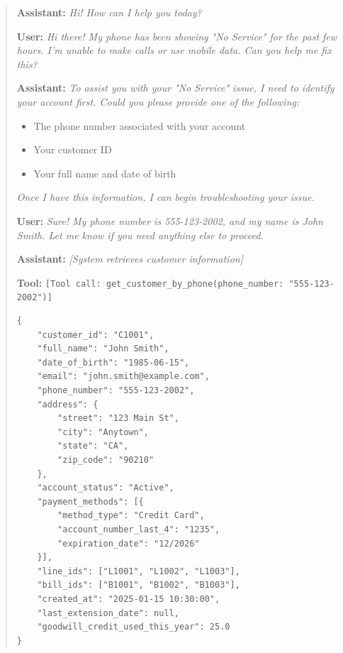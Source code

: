 \begin{quote}
\noindent\textbf{Assistant:} \textit{Hi! How can I help you today?}

\vspace{0.5em}
\noindent\textbf{User:} \textit{Hi there! My phone has been showing "No Service" for the past few hours. I'm unable to make calls or use mobile data. Can you help me fix this?}

\vspace{0.5em}
\noindent\textbf{Assistant:} \textit{To assist you with your "No Service" issue, I need to identify your account first. Could you please provide one of the following:}
\begin{itemize}[leftmargin=*]
\item The phone number associated with your account
\item Your customer ID
\item Your full name and date of birth
\end{itemize}
\textit{Once I have this information, I can begin troubleshooting your issue.}

\vspace{0.5em}
\noindent\textbf{User:} \textit{Sure! My phone number is 555-123-2002, and my name is John Smith. Let me know if you need anything else to proceed.}

\vspace{0.5em}
\noindent\textbf{Assistant:} \textit{[System retrieves customer information]}

\vspace{0.5em}
\noindent\textbf{Tool:} \texttt{[Tool call: get\_customer\_by\_phone(phone\_number: "555-123-2002")]}

\begin{verbatim}
{
    "customer_id": "C1001",
    "full_name": "John Smith",
    "date_of_birth": "1985-06-15",
    "email": "john.smith@example.com",
    "phone_number": "555-123-2002",
    "address": {
        "street": "123 Main St",
        "city": "Anytown",
        "state": "CA",
        "zip_code": "90210"
    },
    "account_status": "Active",
    "payment_methods": [{
        "method_type": "Credit Card",
        "account_number_last_4": "1235",
        "expiration_date": "12/2026"
    }],
    "line_ids": ["L1001", "L1002", "L1003"],
    "bill_ids": ["B1001", "B1002", "B1003"],
    "created_at": "2025-01-15 10:30:00",
    "last_extension_date": null,
    "goodwill_credit_used_this_year": 25.0
}
\end{verbatim}


\end{quote}
